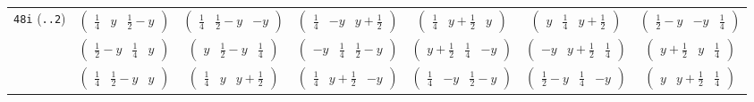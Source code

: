 \documentclass[fleqn,9pt,landscape]{jsarticle}
\begin{document}
\begin{center}
\begin{longtable}{ccccccc}
{\tt 48i} ({\tt ..2}) & $ \begin{pmatrix} \frac{1}{4} & y & \frac{1}{2} - y \end{pmatrix} $ & $ \begin{pmatrix} \frac{1}{4} & \frac{1}{2} - y & - y \end{pmatrix} $ & $ \begin{pmatrix} \frac{1}{4} & - y & y + \frac{1}{2} \end{pmatrix} $ & $ \begin{pmatrix} \frac{1}{4} & y + \frac{1}{2} & y \end{pmatrix} $ & $ \begin{pmatrix} y & \frac{1}{4} & y + \frac{1}{2} \end{pmatrix} $ & $ \begin{pmatrix} \frac{1}{2} - y & - y & \frac{1}{4} \end{pmatrix} $ \\
& $ \begin{pmatrix} \frac{1}{2} - y & \frac{1}{4} & y \end{pmatrix} $ & $ \begin{pmatrix} y & \frac{1}{2} - y & \frac{1}{4} \end{pmatrix} $ & $ \begin{pmatrix} - y & \frac{1}{4} & \frac{1}{2} - y \end{pmatrix} $ & $ \begin{pmatrix} y + \frac{1}{2} & \frac{1}{4} & - y \end{pmatrix} $ & $ \begin{pmatrix} - y & y + \frac{1}{2} & \frac{1}{4} \end{pmatrix} $ & $ \begin{pmatrix} y + \frac{1}{2} & y & \frac{1}{4} \end{pmatrix} $ \\
& $ \begin{pmatrix} \frac{1}{4} & \frac{1}{2} - y & y \end{pmatrix} $ & $ \begin{pmatrix} \frac{1}{4} & y & y + \frac{1}{2} \end{pmatrix} $ & $ \begin{pmatrix} \frac{1}{4} & y + \frac{1}{2} & - y \end{pmatrix} $ & $ \begin{pmatrix} \frac{1}{4} & - y & \frac{1}{2} - y \end{pmatrix} $ & $ \begin{pmatrix} \frac{1}{2} - y & \frac{1}{4} & - y \end{pmatrix} $ & $ \begin{pmatrix} y & y + \frac{1}{2} & \frac{1}{4} \end{pmatrix} $ \\

\end{longtable}
\end{center}
\end{document}
